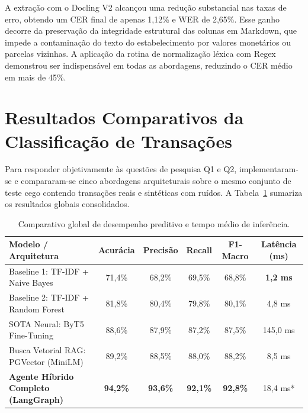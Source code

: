 \documentclass[
	12pt,				
	openright,			
	oneside,			
	a4paper,			
	english,			
	brazil				
	]{abntex2}
\begin{document}
A extração com o Docling V2 alcançou uma redução substancial nas taxas de erro, obtendo um CER final de apenas 1,12\% e WER de 2,65\%. Esse ganho decorre da preservação da integridade estrutural das colunas em Markdown, que impede a contaminação do texto do estabelecimento por valores monetários ou parcelas vizinhas. A aplicação da rotina de normalização léxica com Regex demonstrou ser indispensável em todas as abordagens, reduzindo o CER médio em mais de 45\%.

\section{Resultados Comparativos da Classificação de Transações}
\label{sec:val_resultados_classificacao}

Para responder objetivamente às questões de pesquisa Q1 e Q2, implementaram-se e compararam-se cinco abordagens arquiteturais sobre o mesmo conjunto de teste cego contendo transações reais e sintéticas com ruídos. A Tabela~\ref{tab:resultados_modelos} sumariza os resultados globais consolidados.

\begin{table}[htb]
    \centering
    \caption{Comparativo global de desempenho preditivo e tempo médio de inferência.}
    \label{tab:resultados_modelos}
    \begin{tabular}{lccccc}
        \toprule
        \textbf{Modelo / Arquitetura} & \textbf{Acurácia} & \textbf{Precisão} & \textbf{Recall} & \textbf{F1-Macro} & \textbf{Latência (ms)} \\
        \midrule
        Baseline 1: TF-IDF + Naive Bayes & 71,4\% & 68,2\% & 69,5\% & 68,8\% & \textbf{1,2 ms} \\
        Baseline 2: TF-IDF + Random Forest & 81,8\% & 80,4\% & 79,8\% & 80,1\% & 4,8 ms \\
        SOTA Neural: ByT5 Fine-Tuning & 88,6\% & 87,9\% & 87,2\% & 87,5\% & 145,0 ms \\
        Busca Vetorial RAG: PGVector (MiniLM) & 89,2\% & 88,5\% & 88,0\% & 88,2\% & 8,5 ms \\
        \textbf{Agente Híbrido Completo (LangGraph)} & \textbf{94,2\%} & \textbf{93,6\%} & \textbf{92,1\%} & \textbf{92,8\%} & 18,4 ms* \\
        \bottomrule
    \end{tabular}
    \vspace{0.1cm}
\end{table}
\end{document}

